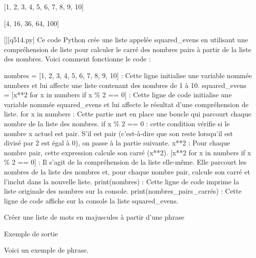 [1, 2, 3, 4, 5, 6, 7, 8, 9, 10]

[4, 16, 36, 64, 100]
        \par
        \begin{solution}
            \renewcommand{\nomfichier}{q514.py}
            \pythonfile{\chemincode \nomfichier}[][\nomfichier]
            Ce code Python crée une liste appelée squared\_evens en utilisant une compréhension de liste pour calculer le carré des nombres pairs à partir de la liste des nombres. Voici comment fonctionne le code :

    nombres = [1, 2, 3, 4, 5, 6, 7, 8, 9, 10] : Cette ligne initialise une variable nommée numbers et lui affecte une liste contenant des nombres de 1 à 10.
    squared\_evens = [x**2 for x in numbers if x \% 2 == 0] : Cette ligne de code initialise une variable nommée squared\_evens et lui affecte le résultat d'une compréhension de liste.
        for x in numbers : Cette partie met en place une boucle qui parcourt chaque nombre de la liste des nombres.
        if x \% 2 == 0 : cette condition vérifie si le nombre x actuel est pair. S'il est pair (c'est-à-dire que son reste lorsqu'il est divisé par 2 est égal à 0), on passe à la partie suivante.
        x**2 : Pour chaque nombre pair, cette expression calcule son carré (x**2).
        [x**2 for x in numbers if x \% 2 == 0] : Il s'agit de la compréhension de la liste elle-même. Elle parcourt les nombres de la liste des nombres et, pour chaque nombre pair, calcule son carré et l'inclut dans la nouvelle liste.
    print(nombres) : Cette ligne de code imprime la liste originale des nombres sur la console.
    print(nombres\_pairs\_carrés) : Cette ligne de code affiche sur la console la liste squared\_evens.
        \end{solution}
        

        \question
        Créer une liste de mots en majuscules à partir d'une phrase

Exemple de sortie

Voici un exemple de phrase.

